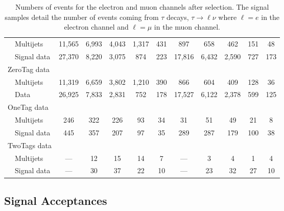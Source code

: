 \begin{table}[!h!tbp]
\begin{center}
\begin{minipage}{6.5 in}
\begin{ruledtabular}
\begin{tabular}{l||ccccc|ccccc}
~~Multijets              &  11,565 &  6,993 &  4,043 &  1,317 &    431 &     897 &    658 &    462 &    151 &    48 \\
~~Signal data            &  27,370 &  8,220 &  3,075 &    874 &    223 &  17,816 &  6,432 &  2,590 &    727 &   173 \\
ZeroTag data             &         &        &        &        &        &         &        &        &        &       \\
~~Multijets              &  11,319 &  6,659 &  3,802 &  1,210 &    390 &     866 &    604 &    409 &    128 &    36 \\
~~Data                   &  26,925 &  7,833 &  2,831 &    752 &    178 &  17,527 &  6,122 &  2,378 &    599 &   125 \\
OneTag data              &         &        &        &        &        &         &        &        &        &       \\
~~Multijets              &     246 &    322 &    226 &     93 &     34 &      31 &     51 &     49 &     21 &     8 \\
~~Signal data            &     445 &    357 &    207 &     97 &     35 &     289 &    287 &    179 &    100 &    38 \\
TwoTags data             &         &        &        &        &        &         &        &        &        &       \\
~~Multijets              &     --- &     12 &     15 &     14 &      7 &     --- &      3 &      4 &      1 &     4 \\
~~Signal data            &     --- &     30 &     37 &     22 &     10 &     --- &     23 &     32 &     27 &    10 
\end{tabular}
\end{ruledtabular} 
\vspace{-0.1in}
\caption[numbersofevents]{Numbers of events for the electron and muon
channels after selection. The signal samples detail the number of
events coming from $\tau$ decays, $\tau\to\ell\nu$ where $\ell=e$ in
the electron channel and $\ell=\mu$ in the muon channel.}
\label{numbers-of-events}
\end{minipage}
\end{center}
\end{table}


\clearpage

\subsection{Signal Acceptances}
\label{signal-acceptances}

